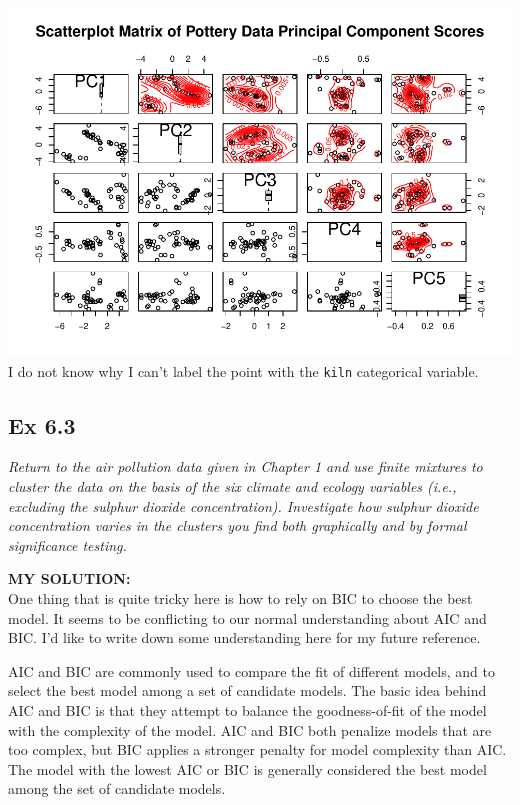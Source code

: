 \documentclass[
]{article}
\begin{document}
\includegraphics{HUDM6122-Homework_06-Chenguang-Pan_files/figure-latex/unnamed-chunk-5-1.pdf}
I do not know why I can't label the point with the \texttt{kiln}
categorical variable.

\hypertarget{ex-6.3}{%
\subsection{Ex 6.3}\label{ex-6.3}}

\emph{Return to the air pollution data given in Chapter 1 and use finite
mixtures to cluster the data on the basis of the six climate and ecology
variables (i.e., excluding the sulphur dioxide concentration).
Investigate how sulphur dioxide concentration varies in the clusters you
find both graphically and by formal significance testing.}

\textbf{MY SOLUTION:}\\
One thing that is quite tricky here is how to rely on BIC to choose the
best model. It seems to be conflicting to our normal understanding about
AIC and BIC. I'd like to write down some understanding here for my
future reference.

AIC and BIC are commonly used to compare the fit of different models,
and to select the best model among a set of candidate models. The basic
idea behind AIC and BIC is that they attempt to balance the
goodness-of-fit of the model with the complexity of the model. AIC and
BIC both penalize models that are too complex, but BIC applies a
stronger penalty for model complexity than AIC. The model with the
lowest AIC or BIC is generally considered the best model among the set
of candidate models.
\end{document}
